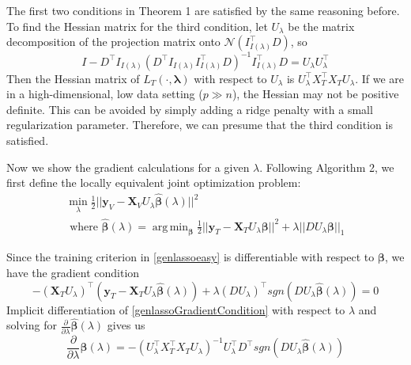 \documentclass[10pt,letterpaper]{article}
\DeclareMathOperator*{\argmin}{arg\,min}
\begin{document}
The first two conditions in Theorem 1 are satisfied by the same reasoning before. To find the Hessian matrix for the third condition, let $U_\lambda$ be the matrix decomposition of the projection matrix onto $\mathcal{N}(I_{I(\lambda)}^\top D)$, so
\begin{equation}
I - D^\top I_{I(\lambda)} \left ( D^\top I_{I(\lambda)} I_{I(\lambda)}^\top D\right )^{-1} I_{I(\lambda)}^\top D = U_\lambda U_\lambda^\top
\end{equation}
Then the Hessian matrix of $L_T(\cdot, \boldsymbol{\lambda})$ with respect to $U_\lambda$ is
$U_\lambda^\top X_T^\top X_T U_\lambda$. If we are in a high-dimensional, low data setting ($p \gg n$), the Hessian may not be positive definite. This can be avoided by simply adding a ridge penalty with a small regularization parameter. Therefore, we can presume that the third condition is satisfied.

Now we show the gradient calculations for a given $\lambda$. Following Algorithm 2, we first define the locally equivalent joint optimization problem:
\begin{equation}
\begin{array}{c}
\min_{\lambda} \frac{1}{2} \lvert\lvert \boldsymbol{y}_V - \boldsymbol{X}_V U_\lambda \hat{\boldsymbol{\beta}} (\lambda) \rvert\rvert ^2 \\
\text{ where }
\hat{\boldsymbol{\beta}} (\lambda) =
\argmin_{\boldsymbol{\beta}}
\frac{1}{2} \lvert\lvert \boldsymbol{y}_T - \boldsymbol{X}_T U_\lambda \boldsymbol{\beta} \rvert\rvert ^2
+ \lambda \lvert\lvert D U_\lambda \boldsymbol{\beta} \rvert \rvert_1
\end{array}
\label{genlassoeasy}
\end{equation}

Since the training criterion in \eqref{genlassoeasy} is differentiable with respect to $\boldsymbol \beta$, we have the gradient condition
\begin{equation}
- (\boldsymbol{X}_T U_\lambda)^\top (\boldsymbol{y}_T - \boldsymbol{X}_T U_\lambda \hat {\boldsymbol\beta} (\lambda))
+ \lambda (D U_\lambda)^\top sgn(DU_\lambda \hat{\boldsymbol \beta}(\lambda)) = 0
\label{genlassoGradientCondition}
\end{equation}
Implicit differentiation of \eqref{genlassoGradientCondition} with respect to $\lambda$ and solving for $\frac{\partial}{\partial \lambda} \hat{\boldsymbol \beta}(\lambda)$ gives us
\begin{equation}
\frac{\partial}{\partial \lambda} \hat{\boldsymbol \beta}(\lambda) =
-(U_\lambda^\top X_T^\top X_T U_\lambda)^{-1} U_\lambda^\top D^\top sgn(DU_\lambda \hat{\boldsymbol \beta}(\lambda))
\label{genlassoParamDeriv}
\end{equation}
\end{document}
